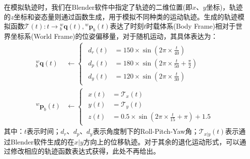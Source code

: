 在模拟轨迹时，我们在Blender软件中指定了轨迹的二维位置(即$x$、$y$坐标)，轨迹的$z$坐标和姿态量则通过函数生成，用于模拟不同种类的运动轨迹。生成的轨迹模拟函数$\mathcal{T}(t):t\to {^{w}_{b}\boldsymbol{q}(t)},{^{w}\boldsymbol{p}_{b}(t)} $表达了时刻$t$时载体系(Body Frame)相对于世界坐标系(World Frame)的位姿偏移量，对于随机运动，其具体表达为：
\begin{equation}
\begin{aligned}
  {^{w}_{b}\boldsymbol{q}}(t)&\gets\begin{cases}
    \begin{aligned}
      d_{r}(t) & =150\times\sin(2\pi\times\frac{t}{40})               \\
      d_{p}(t) & =180\times\sin(2\pi\times\frac{t}{50}+\frac{\pi}{2}) \\
      d_{y}(t) & =120\times\sin(2\pi\times\frac{t}{30})
    \end{aligned}
  \end{cases}\\
  {^{w}\boldsymbol{p}_{b}}(t)&\gets\begin{cases}
    \begin{aligned}
      x(t) & =\mathcal{T}_x(t)                              \\
      y(t) & =\mathcal{T}_y(t)                              \\
      z(t) & =0.5\times\sin(2\pi\times\frac{t}{15}+\pi)+1.5
    \end{aligned}
  \end{cases}
\end{aligned}
\end{equation}
其中：$t$表示时间；$d_{r}$、$d_{p}$、$d_{y}$表示角度制下的Roll-Pitch-Yaw角；$\mathcal{T}_{x|y}(t)$表示通过Blender软件生成的在$x|y$方向上的位移轨迹。对于其余的退化运动形式，可以通过修改相应的轨迹函数表达式获得，此处不再给出。
